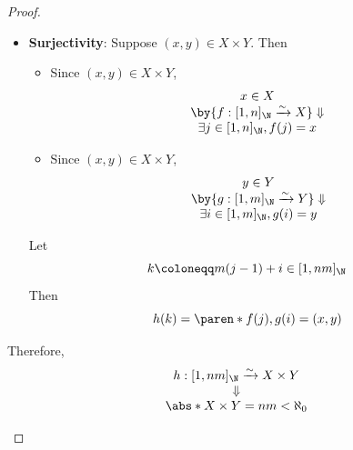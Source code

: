 \begin{proof}
\begin{itemize}
\begin{itemize}
\[\begin{array}{c}
                      \by{\ensuremath{j_{k_{1}} = j_{k_{2}}}} \Downarrow                      \\
                      k_{1} = k_{2}
                    \end{array}
                  \]
            \item \textbf{Surjectivity}: Suppose $(x, y) \in X \times Y$. Then
                  \begin{itemize}
                    \item Since $(x, y) \in X \times Y$,
                          \[
                            \begin{array}{c}
                              x \in X                                                          \\
                              \by{\ensuremath{f: [1, n]_{\N} \xrightarrow{\sim} X}} \Downarrow \\
                              \exists j \in [1, n]_{\N}, f(j) = x
                            \end{array}
                          \]
                    \item Since $(x, y) \in X \times Y$,
                          \[
                            \begin{array}{c}
                              y \in Y                                                          \\
                              \by{\ensuremath{g: [1, m]_{\N} \xrightarrow{\sim} Y}} \Downarrow \\
                              \exists i \in [1, m]_{\N}, g(i) = y
                            \end{array}
                          \]
                  \end{itemize}
                  Let
                  \[
                    k \coloneqq m(j - 1) + i \in [1, nm]_{\N}
                  \]
                  Then
                  \[
                    h(k) = \paren*{f(j), g(i)} = (x, y)
                  \]
          \end{itemize}
          Therefore,
          \[
            \begin{array}{c}
              h: [1, nm]_{\N} \xrightarrow{\sim} X \times Y \\
              \Downarrow                                    \\
              \abs*{X \times Y} = nm < \aleph_{0}
            \end{array}
          \]
  \end{itemize}
\end{proof}

